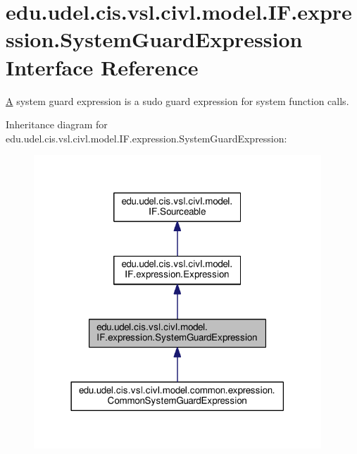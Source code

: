 \hypertarget{interfaceedu_1_1udel_1_1cis_1_1vsl_1_1civl_1_1model_1_1IF_1_1expression_1_1SystemGuardExpression}{}\section{edu.\+udel.\+cis.\+vsl.\+civl.\+model.\+I\+F.\+expression.\+System\+Guard\+Expression Interface Reference}
\label{interfaceedu_1_1udel_1_1cis_1_1vsl_1_1civl_1_1model_1_1IF_1_1expression_1_1SystemGuardExpression}


\hyperlink{structA}{A} system guard expression is a sudo guard expression for system function calls.  




Inheritance diagram for edu.\+udel.\+cis.\+vsl.\+civl.\+model.\+I\+F.\+expression.\+System\+Guard\+Expression\+:
\nopagebreak
\begin{figure}[H]
\begin{center}
\leavevmode
\includegraphics[width=306pt]{interfaceedu_1_1udel_1_1cis_1_1vsl_1_1civl_1_1model_1_1IF_1_1expression_1_1SystemGuardExpression__inherit__graph}
\end{center}
\end{figure}


